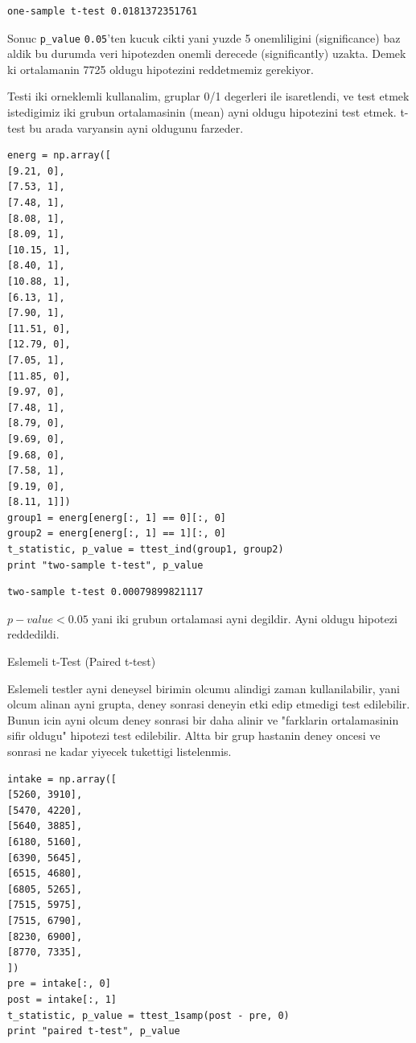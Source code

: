 \documentclass[12pt,fleqn]{article}\usepackage{../common}
\begin{document}
\begin{verbatim}
one-sample t-test 0.0181372351761
\end{verbatim}

Sonuc \verb!p_value! \verb!0.05!'ten kucuk cikti yani
yuzde 5 onemliligini (significance) baz aldik bu durumda veri
hipotezden onemli derecede (significantly) uzakta. Demek ki
ortalamanin 7725 oldugu hipotezini reddetmemiz gerekiyor.

Testi iki orneklemli kullanalim, gruplar 0/1 degerleri ile
isaretlendi, ve test etmek istedigimiz iki grubun ortalamasinin (mean)
ayni oldugu hipotezini test etmek. t-test bu arada varyansin ayni
oldugunu farzeder.

\begin{verbatim}
energ = np.array([
[9.21, 0],
[7.53, 1],
[7.48, 1],
[8.08, 1],
[8.09, 1],
[10.15, 1],
[8.40, 1],
[10.88, 1],
[6.13, 1],
[7.90, 1],
[11.51, 0],
[12.79, 0],
[7.05, 1],
[11.85, 0],
[9.97, 0],
[7.48, 1],
[8.79, 0],
[9.69, 0],
[9.68, 0],
[7.58, 1],
[9.19, 0],
[8.11, 1]])
group1 = energ[energ[:, 1] == 0][:, 0]
group2 = energ[energ[:, 1] == 1][:, 0]
t_statistic, p_value = ttest_ind(group1, group2)
print "two-sample t-test", p_value
\end{verbatim}

\begin{verbatim}
two-sample t-test 0.00079899821117
\end{verbatim}

$p-value < 0.05$ yani iki grubun ortalamasi ayni degildir. Ayni oldugu
hipotezi reddedildi.

Eslemeli t-Test (Paired t-test)

Eslemeli testler ayni deneysel birimin olcumu alindigi zaman
kullanilabilir, yani olcum alinan ayni grupta, deney sonrasi deneyin
etki edip etmedigi test edilebilir. Bunun icin ayni olcum deney
sonrasi bir daha alinir ve "farklarin ortalamasinin sifir oldugu"
hipotezi test edilebilir. Altta bir grup hastanin deney oncesi ve
sonrasi ne kadar yiyecek tukettigi listelenmis. 

\begin{verbatim}
intake = np.array([
[5260, 3910],
[5470, 4220],
[5640, 3885],
[6180, 5160],
[6390, 5645],
[6515, 4680],
[6805, 5265],
[7515, 5975],
[7515, 6790],
[8230, 6900],
[8770, 7335],
])
pre = intake[:, 0]
post = intake[:, 1]
t_statistic, p_value = ttest_1samp(post - pre, 0)
print "paired t-test", p_value
\end{verbatim}
\end{document}
